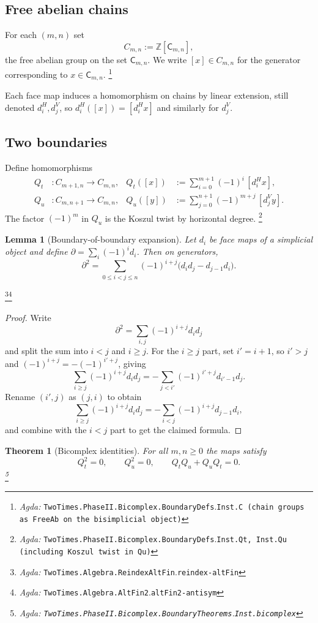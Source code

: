 \documentclass{article}
\newcommand{\CSK}{\mathsf{C}}
\newcommand{\Agda}[1]{\texttt{#1}}
\newcommand{\AgdaRef}[2]{\emph{Agda: }\Agda{#1}.\Agda{#2}}
\newcommand{\AgdaNote}[2]{\footnote{\AgdaRef{#1}{#2}}}
\theoremstyle{definition}
\theoremstyle{plain}
\newtheorem{lemma}{Lemma}[section]
\newtheorem{theorem}{Theorem}[section]
\begin{document}
\subsection{Free abelian chains}
For each $(m,n)$ set
\[C_{m,n}:=\mathbb Z[\CSK_{m,n}],\]
the free abelian group on the set $\CSK_{m,n}$. We write $[x]\in C_{m,n}$ for the
generator corresponding to $x\in\CSK_{m,n}$.
\AgdaNote{TwoTimes.PhaseII.Bicomplex.BoundaryDefs}{Inst.C (chain groups as FreeAb on the bisimplicial object)}

Each face map induces a homomorphism on chains by linear extension, still denoted
$d^H_i,d^V_j$, so $d^H_i([x])=[d^H_i x]$ and similarly for $d^V_j$.

\subsection{Two boundaries}\label{subsec:limited-scope-theorem-translation-004}
Define homomorphisms
\begin{align}
  Q_t &: C_{m+1,n}\to C_{m,n},
  &Q_t([x]) &:= \sum_{i=0}^{m+1} (-1)^i\,[d^H_i x],
  \\
  Q_u &: C_{m,n+1}\to C_{m,n},
  &Q_u([y]) &:= \sum_{j=0}^{n+1} (-1)^{m+j}\,[d^V_j y].
\end{align}
The factor $(-1)^m$ in $Q_u$ is the Koszul twist by horizontal degree.
\AgdaNote{TwoTimes.PhaseII.Bicomplex.BoundaryDefs}{Inst.Qt, Inst.Qu (including Koszul twist in Qu)}

\begin{lemma}[Boundary-of-boundary expansion]
\label{lem:boundary-boundary}
Let $d_i$ be face maps of a simplicial object and define
$\partial=\sum_i (-1)^i d_i$. Then on generators,
\[
\partial^2
=\sum_{0\le i<j\le n}(-1)^{i+j}\big(d_i d_j - d_{j-1} d_i\big).
\]
\end{lemma}
\AgdaNote{TwoTimes.Algebra.ReindexAltFin}{reindex-altFin}\AgdaNote{TwoTimes.Algebra.AltFin2}{altFin2-antisym}

\begin{proof}
Write
\[
\partial^2=\sum_{i,j}(-1)^{i+j}d_i d_j
\]
and split the sum into $i<j$ and $i\ge j$. For the $i\ge j$ part, set $i'=i+1$,
so $i'>j$ and $(-1)^{i+j}=-(-1)^{i'+j}$, giving
\[
\sum_{i\ge j}(-1)^{i+j}d_i d_j
=-\sum_{j<i'}(-1)^{i'+j}d_{i'-1}d_j.
\]
Rename $(i',j)$ as $(j,i)$ to obtain
\[
\sum_{i\ge j}(-1)^{i+j}d_i d_j
=-\sum_{i<j}(-1)^{i+j}d_{j-1}d_i,
\]
and combine with the $i<j$ part to get the claimed formula.
\end{proof}

\begin{theorem}[Bicomplex identities]
\label{thm:bicomplex}
For all $m,n\ge 0$ the maps satisfy
\[Q_t^2 = 0,\qquad Q_u^2=0,\qquad Q_tQ_u + Q_uQ_t = 0.\]
\AgdaNote{TwoTimes.PhaseII.Bicomplex.BoundaryTheorems}{Inst.bicomplex}
\end{theorem}
\end{document}
